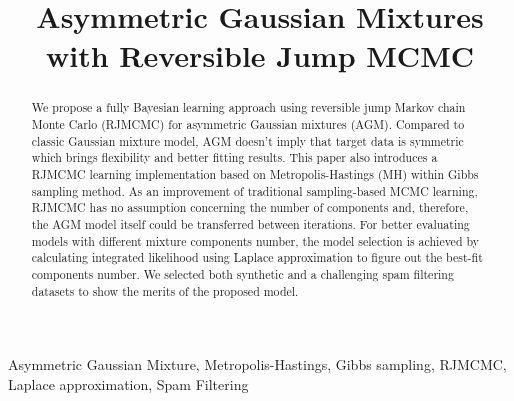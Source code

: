\documentclass[conference]{IEEEtran}
\begin{document}
\title{Asymmetric Gaussian Mixtures with Reversible Jump MCMC\\
}

\author{
\and
{}
}

\maketitle

\begin{abstract}
We propose a fully Bayesian learning approach using reversible jump Markov  chain Monte Carlo (RJMCMC) for asymmetric Gaussian mixtures (AGM). Compared to classic Gaussian mixture model, AGM doesn't imply that target data is symmetric which brings flexibility and better fitting results. This paper also introduces a RJMCMC learning implementation based on Metropolis-Hastings (MH) within Gibbs sampling method. As an improvement of traditional sampling-based MCMC learning, RJMCMC has no assumption concerning the number of components and, therefore, the AGM model itself could be transferred between iterations. For better evaluating models with different mixture components number, the model selection is achieved by calculating integrated likelihood using Laplace approximation to figure out the best-fit components number. We selected both synthetic and a challenging spam filtering datasets to show the merits of the proposed model. 
\end{abstract}

\begin{IEEEkeywords}
Asymmetric Gaussian Mixture, Metropolis-Hastings, Gibbs sampling, RJMCMC, Laplace approximation, Spam Filtering
\end{IEEEkeywords}
\end{document}
